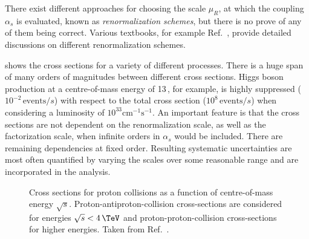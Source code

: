 There exist different approaches for choosing the scale $\mu_R$, at which the coupling $\alpha_s$ is evaluated, known as \emph{renormalization schemes}, but there is no prove of any of them being correct.
Various textbooks, for example Ref.~\cite{Peskin:1995ev}, provide detailed discussions on different renormalization schemes.

 shows the cross sections for a variety of different processes. There is a huge span of many orders of magnitudes between different cross sections. Higgs boson production at a centre-of-mass energy of 13\,\TeV, for example, is highly suppressed ($10^{-2}\,\text{events}/s$) with respect to the total cross section ($10^8\,\text{events}/s$) when considering a luminosity of $10^{33}\mathrm{cm^{-1}s^{-1}}$.
An important feature is that the cross sections are not dependent on the renormalization scale, as well as the factorization scale, when infinite orders in $\alpha_s$ would be included. There are remaining dependencies at fixed order. Resulting systematic uncertainties are most often quantified by varying the scales over some reasonable range and are incorporated in the analysis.

\begin{figure}
  \caption[Cross sections for proton collisions as a function of centre-of-mass energy $\sqrt{s}$.]{Cross sections for proton collisions as a function of centre-of-mass energy $\sqrt{s}$. Proton-antiproton-collision cross-sections are considered for energies $\sqrt{s} < 4\,\TeV$ and proton-proton-collision cross-sections for higher energies. Taken from Ref.~\cite{ref:plotsStirling}.}
  \label{fig:xsec}
\end{figure}



